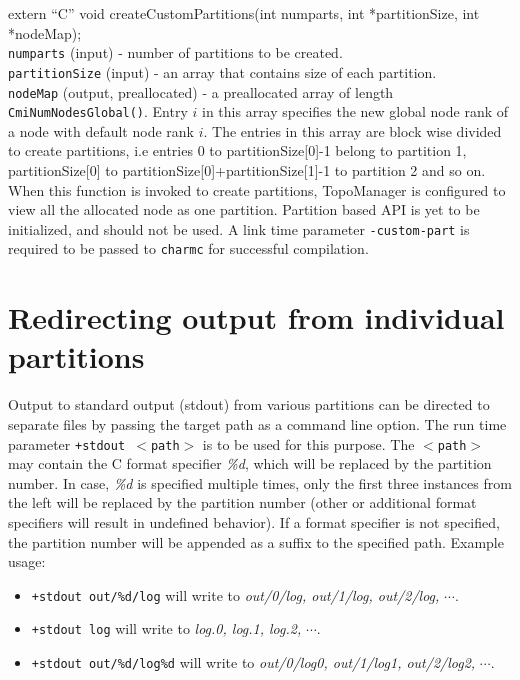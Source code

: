 \begin{itemize}
extern ``C'' void createCustomPartitions(int numparts, int *partitionSize, int *nodeMap);\\
{\tt numparts} (input) - number of partitions to be created. \\
{\tt partitionSize} (input) - an array that contains size of each partition. \\
{\tt nodeMap} (output, preallocated) - a preallocated array of length {\tt CmiNumNodesGlobal()}.
Entry $i$ in this array specifies the new global node rank of a node with default node rank $i$. 
The entries in this array are block wise divided to create partitions, i.e entries 0 to 
partitionSize[0]-1 belong to partition 1, partitionSize[0] to
partitionSize[0]+partitionSize[1]-1 to partition 2 and so on.\\

When this function is invoked to create partitions, TopoManager is configured to 
view all the allocated node as one partition. Partition based API is yet to be 
initialized, and should not be used. A link time parameter {\tt -custom-part} 
is required to be passed to {\tt charmc} for successful compilation.
\end{itemize}

\section{Redirecting output from individual partitions}
Output to standard output (stdout) from various partitions can be directed 
to separate files by passing the target path as a command line option. The run
time parameter {\tt +stdout $<$path$>$} is to be used for this purpose. The
{\tt $<$path$>$} may contain the C format specifier \emph{\%d}, which will be replaced by the
partition number. In case, \emph{\%d} is specified multiple times, only the first
three instances from the left will be replaced by the partition number (other or additional format specifiers will result in undefined behavior). If a format specifier is not specified, 
the partition number will be appended as a suffix to the specified path. Example usage:

\begin{itemize}
\item {\tt +stdout out/\%d/log} will write to \emph{out/0/log, out/1/log,
out/2/log,} $\cdots$.
\item {\tt +stdout log} will write to \emph{log.0, log.1, log.2,} $\cdots$.
\item {\tt +stdout out/\%d/log\%d} will write to \emph{out/0/log0, out/1/log1,
out/2/log2,} $\cdots$.
\end{itemize}

